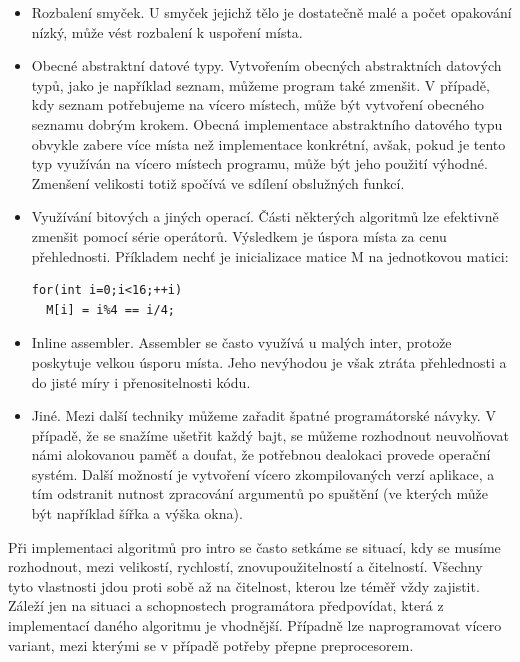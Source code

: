 \begin{itemize}
\item
Rozbalení smyček.
U smyček jejichž tělo je dostatečně malé a počet opakování nízký, může vést rozbalení k uspoření místa.

\item
Obecné abstraktní datové typy.
Vytvořením obecných abstraktních datových typů, jako je například seznam, můžeme program také zmenšit.
V případě, kdy seznam potřebujeme na vícero místech, může být vytvoření obecného seznamu dobrým krokem.
Obecná implementace abstraktního datového typu obvykle zabere více místa než implementace konkrétní, avšak, pokud je tento typ využíván na vícero místech programu, může  být jeho použití výhodné.
Zmenšení velikosti totiž spočívá ve sdílení obslužných funkcí.

\item
Využívání bitových a jiných operací.
Části některých algoritmů lze efektivně zmenšit pomocí série operátorů.
Výsledkem je úspora místa za cenu přehlednosti.
Příkladem nechť je inicializace matice M na jednotkovou matici:
\begin{verbatim}
for(int i=0;i<16;++i)
  M[i] = i%4 == i/4;
\end{verbatim}

\item
Inline assembler.
Assembler se často využívá u malých inter, protože poskytuje velkou úsporu místa.
Jeho nevýhodou je však ztráta přehlednosti a do jisté míry i pře\-no\-si\-tel\-nos\-ti kódu.

\item
Jiné.
Mezi další techniky můžeme zařadit špatné programátorské návyky.
V případě, že se snažíme ušetřit každý bajt, se můžeme rozhodnout neuvolňovat námi alokovanou paměť a doufat, že potřebnou dealokaci provede operační systém.
Další možností je vytvoření vícero zkompilovaných verzí aplikace, a tím odstranit nutnost zpracování argumentů po spuštění (ve kterých může být například šířka a výška okna).

\end{itemize}

Při implementaci algoritmů pro intro se často setkáme se situací, kdy se musíme rozhodnout, mezi velikostí, rychlostí, znovupoužitelností a čitelností.
Všechny tyto vlastnosti jdou proti sobě až na čitelnost, kterou lze téměř vždy zajistit.
Záleží jen na situaci a schopnostech programátora předpovídat, která z implementací daného algoritmu je vhodnější.
Případně lze naprogramovat vícero variant, mezi kterými se v případě potřeby přepne preprocesorem.

